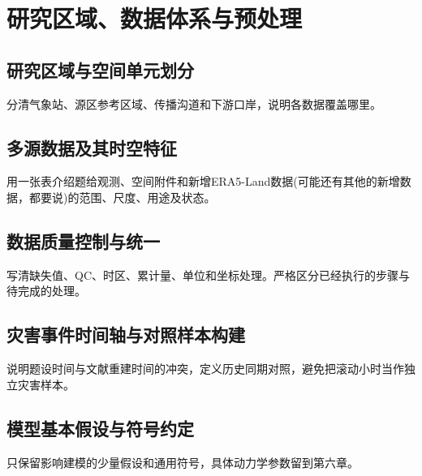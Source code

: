 \section{研究区域、数据体系与预处理}\label{sec:data}

\subsection{研究区域与空间单元划分}\label{sec:study-area}
分清气象站、源区参考区域、传播沟道和下游口岸，说明各数据覆盖哪里。

\subsection{多源数据及其时空特征}\label{sec:data-sources}
用一张表介绍题给观测、空间附件和新增ERA5-Land数据(可能还有其他的新增数据，都要说)的范围、尺度、用途及状态。

\subsection{数据质量控制与统一}\label{sec:quality-control}
写清缺失值、QC、时区、累计量、单位和坐标处理。严格区分已经执行的步骤与待完成的处理。

\subsection{灾害事件时间轴与对照样本构建}\label{sec:event-timeline}
说明题设时间与文献重建时间的冲突，定义历史同期对照，避免把滚动小时当作独立灾害样本。

\subsection{模型基本假设与符号约定}\label{sec:assumptions-symbols}
只保留影响建模的少量假设和通用符号，具体动力学参数留到第六章。
